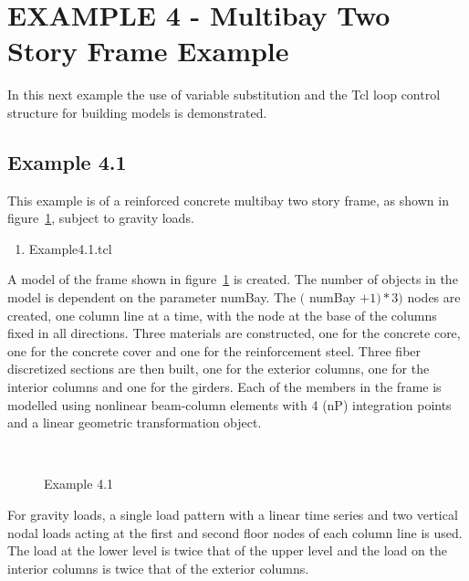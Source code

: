 \documentclass[12pt]{article}
\begin{document}
\pagebreak
\section {EXAMPLE 4 - Multibay Two Story Frame Example}

In this next example the use of variable substitution and the Tcl loop
control structure for building models is demonstrated.

\subsection{Example 4.1}
This example is of a reinforced concrete multibay two story
frame, as shown in figure~\ref{example4}, subject to gravity loads. 


\vspace{0.2in}  
\begin{enumerate} 
\item Example4.1.tcl
\end{enumerate}

\vspace{0.2in} 

A model of the frame shown in figure~\ref{example4} is created. The
number of objects in the model is dependent on the parameter
numBay. The $($ numBay $+1)*3)$ nodes are 
created, one column line at a time, with the node at the base of the
columns fixed in all directions. Three materials are
constructed, one for the concrete core, one for the concrete cover and
one for the reinforcement steel. Three fiber discretized sections are
then built, one for the exterior columns, one for the interior columns
and one for the girders. Each of the members in the frame is modelled
using nonlinear beam-column elements with 4 (nP) integration points
and a linear geometric transformation object.

\begin{figure}[h]
\begin{center}
\leavevmode
\hbox{%
\epsfxsize=5.5in
}
\end{center}
\caption{Example 4.1}
\label{example4}
\end{figure}


For gravity loads, a single load pattern with a linear time series and two
vertical nodal loads acting at the first and second floor nodes of
each column line is used. The load at the lower level is twice that of the
upper level and the load on the interior columns is twice that of the
exterior columns.
\end{document}
